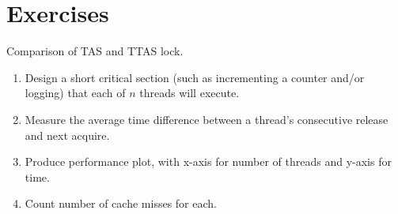 \section{Exercises}
\begin{exercise}
    Comparison of TAS and TTAS lock.
    \begin{enumerate}
        \item Design a short critical section (such as incrementing a counter and/or logging) that each of $n$ threads will execute.
        \item Measure the average time difference between a thread's consecutive release and next acquire.
        \item Produce performance plot, with x-axis for number of threads and y-axis for time.
        \item Count number of cache misses for each.
    \end{enumerate}
\end{exercise}

\begin{exercise}
    
\end{exercise}
